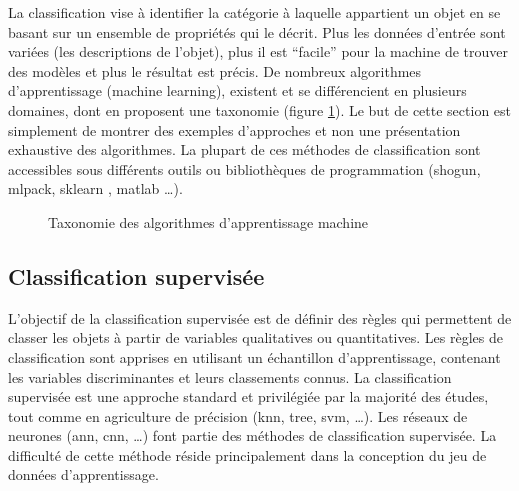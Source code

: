 \documentclass[../thesis.tex]{subfiles}
\begin{document}
    La classification vise à identifier la catégorie à laquelle appartient un objet en se basant sur un ensemble de propriétés qui le décrit. Plus les données d'entrée sont variées (les descriptions de l'objet), plus il est ``facile'' pour la machine de trouver des modèles et plus le résultat est précis. De nombreux algorithmes d'apprentissage (machine learning), existent et se différencient en plusieurs domaines, dont \cite{Yuan2019} en proposent une taxonomie (figure \ref{fig:03-machine-learning-map}). Le but de cette section est simplement de montrer des exemples d'approches et non une présentation exhaustive des algorithmes. La plupart de ces méthodes de classification sont accessibles sous différents outils ou bibliothèques de programmation (shogun, mlpack, sklearn \cite{scikit-learn}, matlab \dots).
    
    \vfill
    \begin{figure}[H]
        \centering
        \footnotesize
        
        \caption{Taxonomie des algorithmes d'apprentissage machine}
        \label{fig:03-machine-learning-map}
    \end{figure}
    \vfill
    
    \subsection{Classification supervisée}
    
    L'objectif de la classification supervisée est de définir des règles qui permettent de classer les objets à partir de variables qualitatives ou quantitatives. Les règles de classification sont apprises en utilisant un échantillon d'apprentissage, contenant les variables discriminantes et leurs classements connus. La classification supervisée est une approche standard et privilégiée par la majorité des études, tout comme en agriculture de précision \cite[p.~37]{MRNL2016} (knn, tree, svm, \dots). Les réseaux de neurones \cite{DBLP:journals/corr/abs-1806-03412,DBLP:journals/corr/abs-1002-4046, Koot891024465110} (ann, cnn, \dots) font partie des méthodes de classification supervisée. La difficulté de cette méthode réside principalement dans la conception du jeu de données d'apprentissage.
    
\end{document}
